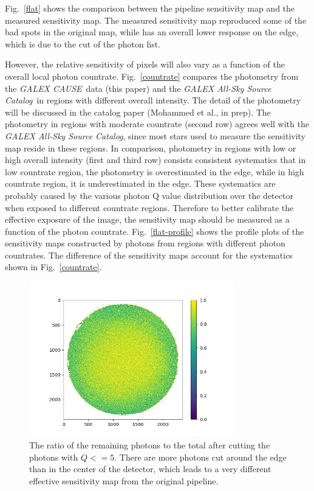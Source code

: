 \documentclass[12pt, preprint]{aastex}
\newcommand{\project}[1]{\textsl{#1}}
\newcommand{\asc}{\project{GALEX All-Sky Source Catalog}}
\newcommand{\cause}{\project{GALEX CAUSE}}
\begin{document}
Fig.~\ref{flat} shows the comparison between the pipeline sensitivity map and the measured sensitivity map.
The measured sensitivity map reproduced some of the bad spots in the original map, while has an overall lower response on the edge, which is due to the cut of the photon list.

However, the relative sensitivity of pixels will also vary as a function of the overall local photon countrate.
Fig.~\ref{countrate} compares the photometry from the \cause\ data (this paper) and the \asc\ in regions with different overall intensity.
The detail of the photometry will be discussed in the catalog paper (Mohammed et al., in prep).
The photometry in regions with moderate countrate (second row) agrees well with the \asc, since most stars used to measure the sensitivity map reside in these regions.
In comparison, photometry in regions with low or high overall intensity (first and third row) consists consistent systematics that in low countrate region, the photometry is overestimated in the edge, while in high countrate region, it is underestimated in the edge.
These systematics are probably caused by the various photon Q value distribution over the detector when exposed to different countrate regions.
Therefore to better calibrate the effective exposure of the image, the sensitivity map should be measured as a function of the photon countrate.
Fig.~\ref{flat-profile} shows the profile plots of the sensitivity maps constructed by photons from regions with different photon countrates.
The difference of the sensitivity maps account for the systematics shown in Fig.~\ref{countrate}.

\begin{figure}[p]
\begin{center}
\includegraphics[width=0.8\textwidth]{figures/q50}
\end{center}
\caption{
  \label{qcut}
  The ratio of the remaining photons to the total after cutting the photons with $Q<=5$.
  There are more photons cut around the edge than in the center of the detector, which leads to a very different effective sensitivity map from the original pipeline.
}
\end{figure}
\end{document}
